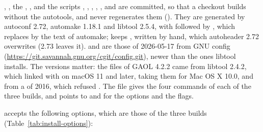 \medskip
{}, , the ,
,  and the scripts ,
, , , ,
 and  are committed, so that a checkout
builds without the autotools, and  never regenerates them
(). They are generated by autoconf
2.72, automake 1.18.1 and libtool 2.5.4, with  followed by , which
 replaces by the text of automake; 
keeps , written by hand, which autoheader
2.72 overwrites (2.73 leaves it).  and 
are those of 2026-05-17 from GNU config
(\url{https://git.savannah.gnu.org/cgit/config.git}), newer than the ones
libtool installs. The versions matter: the files of GAOL 4.2.2 came from
libtool 2.4.2, which linked  with  on macOS 11 and later, taking them for Mac OS X 10.0,
and from a  of 2016, which refused
.\newinvfive{} The file  gives the four
commands of each of the three builds, and points to  and
 for the options and the flags.

\medskip
{} accepts the following options, which are those of the three
builds (Table~\ref{tab:install-options}):

